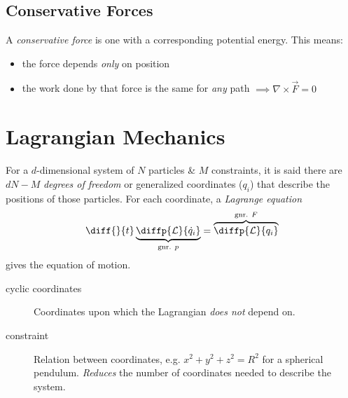 \documentclass[tbtags]{cheatsheet}
\begin{document}
		\subsection{Conservative Forces}
			A \emph{conservative force} is one with a corresponding potential energy. This means:
			\begin{itemize}
				\item the force depends \emph{only} on position
				\item the work done by that force is the same for \emph{any} path $\implies \nabla \times \vec F = 0$
			\end{itemize}

	\section{Lagrangian Mechanics}
		For a $d$-dimensional system of $N$ particles \& $M$ constraints, it is said there are $dN - M$ \emph{degrees of freedom} or generalized coordinates ($q_i$) that describe the positions of those particles. For each coordinate, a \emph{Lagrange equation} \[ \diff{}{t} \underbrace{\diffp{\mathcal{L}}{{\dot{q}_i}}}_\text{gnr. $p$} =  \overbrace{\diffp{\mathcal{L}}{{q_i}}}^\text{gnr. $F$} \] gives the equation of motion.\\
		\begin{description}
			\item[cyclic coordinates] Coordinates upon which the Lagrangian \emph{does not} depend on.
			\item[constraint] Relation between coordinates, e.g. $x^2 + y^2 + z^2 = R^2$ for a spherical pendulum. \emph{Reduces} the number of coordinates needed to describe the system.
		\end{description}
			
\end{document}
